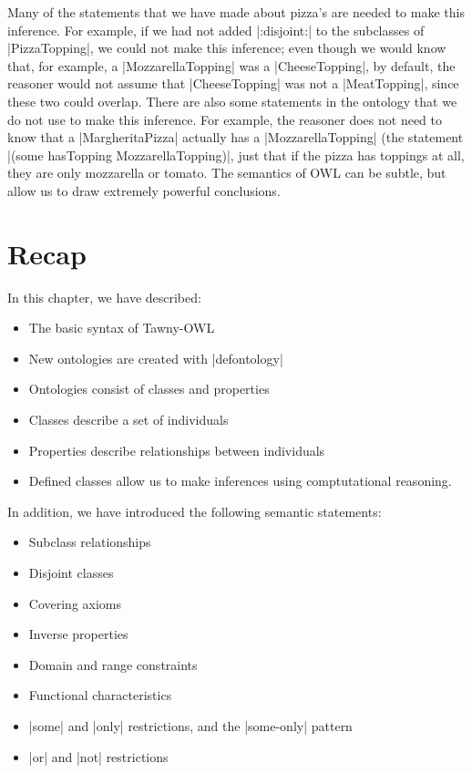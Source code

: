 Many of the statements that we have made about pizza's are needed to make this
inference. For example, if we had not added |:disjoint:| to the subclasses of
|PizzaTopping|, we could not make this inference; even though we would know
that, for example, a |MozzarellaTopping| was a |CheeseTopping|, by default,
the reasoner would not assume that |CheeseTopping| was not a |MeatTopping|,
since these two could overlap. There are also some statements in the ontology
that we do not use to make this inference. For example, the reasoner does not
need to know that a |MargheritaPizza| actually has a |MozzarellaTopping| (the
statement |(some hasTopping MozzarellaTopping)|, just that if the pizza has
toppings at all, they are only mozzarella or tomato. The semantics of OWL can
be subtle, but allow us to draw extremely powerful conclusions.


\section{Recap}

In this chapter, we have described:

\begin{itemize}
\item The basic syntax of Tawny-OWL
\item New ontologies are created with |defontology|
\item Ontologies consist of classes and properties
\item Classes describe a set of individuals
\item Properties describe relationships between individuals
\item Defined classes allow us to make inferences using comptutational
  reasoning.
\end{itemize}

In addition, we have introduced the following semantic statements:
\begin{itemize}
\item Subclass relationships
\item Disjoint classes
\item Covering axioms
\item Inverse properties
\item Domain and range constraints
\item Functional characteristics
\item |some| and |only| restrictions, and the |some-only| pattern
\item |or| and |not| restrictions
\end{itemize}

